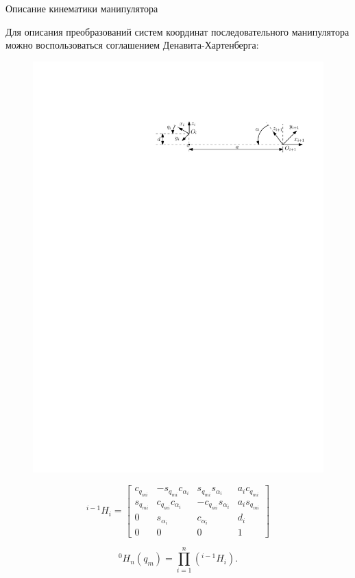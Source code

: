 \documentclass[newPxFont,numfooter,sectionpages]{beamer}
\begin{document}
\begin{frame}{Описание кинематики манипулятора}

	\begin{center}
		\begin{minipage}[b]{0.9\textwidth}
			Для описания преобразований систем координат последовательного манипулятора можно воспользоваться соглашением Денавита-Хартенберга:
		\begin{figure}[H]
		\center
		\renewcommand{\figurename}{}
		\includegraphics[width=0.8\linewidth]{pic/DH.pdf}
		\label{fig:scr1}
	\end{figure}
	
	\[
^{i-1}H_i =
	\begin{bmatrix}
		c_{q_{mi}} & 	-s_{q_{mi}}c_{\alpha_i} & 	s_{q_{mi}}s_{\alpha_i}	&	a_ic_{q_{mi}}\\
		s_{q_{mi}} & 	c_{q_{mi}}c_{\alpha_i} &	-c_{q_{mi}}s_{\alpha_i} &	a_is_{q_{mi}}\\
		0				&	s_{\alpha_i} 						&	c_{\alpha_i}					& 	d_i\\
		0				&	0									&	0								&	1
	\end{bmatrix} \tag{13} \label{eq:13}
\]

\begin{equation}
^{0}H_n(q_{m}) = \prod_{i=1}^{n} \left(^{i-1}H_i\right).
\tag{14} \label{eq:14}
\end{equation}
			
		\end{minipage}
	\end{center}
\end{frame}
\end{document}

